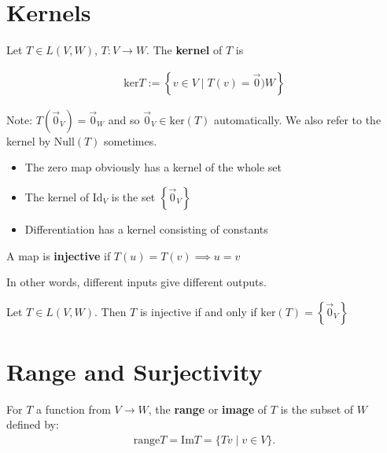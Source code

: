 \documentclass{memoir}
\begin{document}
\section{Kernels}
\begin{defn}[Kernel]
	Let $T \in L(V,W)$, $T:V\to W$. The \textbf{kernel} of $T$ is 

\begin{align*}
	\textrm{ker}T := \left\{ v \in V \mid T(v) = \vec{0})W \right\} 
\end{align*}
\end{defn}
Note: $T(\vec{0}_V) = \vec{0}_W$ and so  $\vec{0}_V \in \text{ker}(T) $ automatically. We also refer to the kernel by Null$(T)$ sometimes.
\begin{exmp}
	\begin{itemize}
		\item The zero map obviously has a kernel of the whole set
		\item The kernel of $\textrm{Id}_V$ is the set $\left\{ \vec{0}_V \right\} $
		\item Differentiation has a kernel consisting of constants
	\end{itemize}
\end{exmp}
\begin{defn}[Injective]
	A map is \textbf{injective} if $T(u) = T(v) \implies u = v$

In other words, different inputs give different outputs.
\end{defn}
\begin{prop}
	Let $T \in L(V,W)$. Then $T$ is injective if and only if $\text{ker}(T) = \left\{ \vec{0}_V \right\} $
\end{prop}
\section{Range and Surjectivity}
\begin{defn}
	For $T$ a function from $V\to W$, the \textbf{range} or \textbf{image} of $T$ is the subset of $W$ defined by:
	\begin{align*}
		\text{range} T = \textrm{Im}T = \{Tv \mid v \in V \} .
	\end{align*}
\end{defn}
\end{document}
